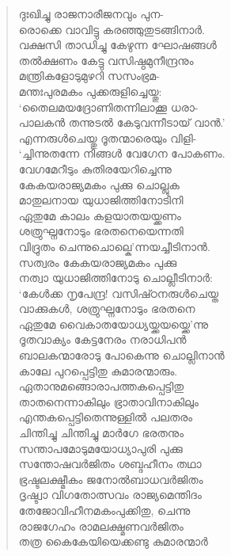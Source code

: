 \begin{verse}
ദുഃഖിച്ചു രാജനാരീജനവും പുന-\\
രൊക്കെ വാവിട്ടു കരഞ്ഞുതുടങ്ങിനാര്‍.\\
വക്ഷസി താഡിച്ചു കേഴുന്ന ഘോഷങ്ങള്‍\\
തല്‍ക്ഷണം കേട്ടു വസിഷ്ഠമുനീന്ദ്രനും\\
മന്ത്രികളോടുമുഴറി സസംഭ്രമ-\\
മന്തഃപുരമകം പുക്കരുളിച്ചെയ്തു:\\
‘തൈലമയദ്രോണിതന്നിലാക്കൂ ധരാ-\\
പാലകന്‍ തന്നുടല്‍ കേടുവന്നീടായ് വാന്‍.’\\
എന്നരുള്‍ചെയ്തു ദൂതന്മാരെയും വിളി-\\
‘ച്ചിന്നുതന്നേ നിങ്ങള്‍ വേഗേന പോകണം.\\
വേഗമേറീടും കുതിരയേറിച്ചെന്നു\\
കേകയരാജ്യമകം പുക്കു ചൊല്ലുക\\
മാതുലനായ യുധാജിത്തിനോടിനി\\
ഏതുമേ കാലം കളയാതയയ്ക്കണം\\
ശത്രുഘ്നനോടും ഭരതനെയെന്നതി\\
വിദ്രുതം ചെന്നുചൊല്കെ’ന്നയച്ചീടിനാന്‍.\\
സത്വരം കേകയരാജ്യമകം പുക്കു\\
നത്വാ യുധാജിത്തിനോടു ചൊല്ലീടിനാര്‍:\\
‘കേള്‍ക്ക നൃപേന്ദ്ര! വസിഷ്‍ഠനരുള്‍ചെയ്ത\\
വാക്കുകള്‍, ശത്രുഘ്നനോടും ഭരതനെ\\
ഏതുമേ വൈകാതയോധ്യയ്ക്കയയ്ക്കെ’ന്നു\\
ദൂതവാക്യം കേട്ടനേരം നരാധിപന്‍\\
ബാലകന്മാരോടു പോകെന്നു ചൊല്ലിനാന്‍\\
കാലേ പുറപ്പെട്ടിതു കുമാരന്മാരും.\\
ഏതാനുമങ്ങൊരാപത്തകപ്പെട്ടിതു\\
താതനെന്നാകിലും ഭ്രാതാവിനാകിലും\\
എന്തകപ്പെട്ടിതെന്നുള്ളില്‍ പലതരം\\
ചിന്തിച്ചു ചിന്തിച്ചു മാര്‍ഗേ ഭരതനും\\
സന്താപമോടുമയോധ്യാപുരി പുക്കു\\
സന്തോഷവര്‍ജിതം ശബ്ദഹീനം തഥാ\\
ഭ്രഷ്ടലക്ഷ്മീകം ജനോല്‍ബാധവര്‍ജിതം\\
ദൃഷ്ട്വാ വിഗതോത്സവം രാജ്യമെന്തിദം\\
തേജോവിഹീനമകംപുക്കിതു, ചെന്നു\\
രാജഗേഹം രാമലക്ഷ്മണവര്‍ജിതം\\
തത്ര കൈകേയിയെക്കണ്ടു കുമാരന്മാര്‍\\

\end{verse}
